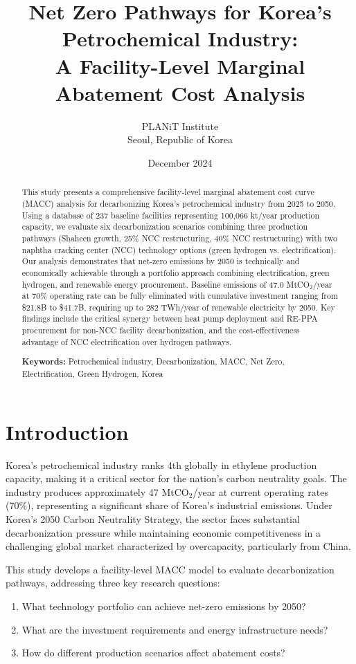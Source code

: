 \documentclass[12pt,a4paper]{article}
\title{Net Zero Pathways for Korea's Petrochemical Industry:\\A Facility-Level Marginal Abatement Cost Analysis}
\author{PLANiT Institute\\Seoul, Republic of Korea}
\date{December 2024}
\begin{document}
\maketitle

\begin{abstract}
This study presents a comprehensive facility-level marginal abatement cost curve (MACC) analysis for decarbonizing Korea's petrochemical industry from 2025 to 2050. Using a database of 237 baseline facilities representing 100,066 kt/year production capacity, we evaluate six decarbonization scenarios combining three production pathways (Shaheen growth, 25\% NCC restructuring, 40\% NCC restructuring) with two naphtha cracking center (NCC) technology options (green hydrogen vs. electrification). Our analysis demonstrates that net-zero emissions by 2050 is technically and economically achievable through a portfolio approach combining electrification, green hydrogen, and renewable energy procurement. Baseline emissions of 47.0 MtCO$_2$/year at 70\% operating rate can be fully eliminated with cumulative investment ranging from \$21.8B to \$41.7B, requiring up to 282 TWh/year of renewable electricity by 2050. Key findings include the critical synergy between heat pump deployment and RE-PPA procurement for non-NCC facility decarbonization, and the cost-effectiveness advantage of NCC electrification over hydrogen pathways.

\textbf{Keywords:} Petrochemical industry, Decarbonization, MACC, Net Zero, Electrification, Green Hydrogen, Korea
\end{abstract}

\section{Introduction}

Korea's petrochemical industry ranks 4th globally in ethylene production capacity, making it a critical sector for the nation's carbon neutrality goals. The industry produces approximately 47 MtCO$_2$/year at current operating rates (70\%), representing a significant share of Korea's industrial emissions. Under Korea's 2050 Carbon Neutrality Strategy, the sector faces substantial decarbonization pressure while maintaining economic competitiveness in a challenging global market characterized by overcapacity, particularly from China.

This study develops a facility-level MACC model to evaluate decarbonization pathways, addressing three key research questions:
\begin{enumerate}
    \item What technology portfolio can achieve net-zero emissions by 2050?
    \item What are the investment requirements and energy infrastructure needs?
    \item How do different production scenarios affect abatement costs?
\end{enumerate}
\end{document}
